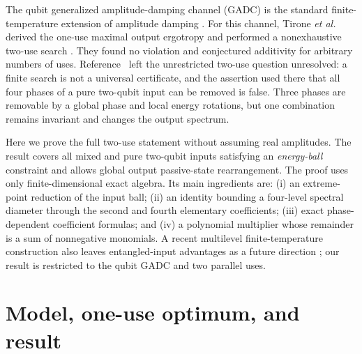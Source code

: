 \documentclass[pra,aps,twocolumn,nofootinbib,superscriptaddress]{revtex4-2}
\begin{document}
The qubit generalized amplitude-damping channel (GADC) is the standard
finite-temperature extension of amplitude damping \cite{khatri2020}.  For
this channel, Tirone \emph{et al.} derived the one-use maximal output
ergotropy and performed a nonexhaustive two-use search \cite{tirone2025}.
They found no violation and conjectured additivity for arbitrary numbers of
uses.  Reference~\cite{tirone2025} left the unrestricted two-use question
unresolved: a finite search is not a universal certificate, and the assertion
used there that all four phases of a pure two-qubit input can be removed is
false.  Three phases are removable by a global phase and local energy
rotations, but one combination remains invariant and changes the output
spectrum.

Here we prove the full two-use statement without assuming real amplitudes.
The result covers all mixed and pure two-qubit inputs satisfying an
\emph{energy-ball} constraint and allows global output passive-state
rearrangement.  The proof uses only finite-dimensional exact algebra.  Its
main ingredients are: (i) an extreme-point reduction of the input ball;
(ii) an identity bounding a four-level spectral diameter through the second
and fourth elementary coefficients; (iii) exact phase-dependent coefficient
formulas; and (iv) a polynomial multiplier whose remainder is a sum of
nonnegative monomials.  A recent multilevel finite-temperature construction
also leaves entangled-input advantages as a future direction
\cite{vetrano2026}; our result is restricted to the qubit GADC and two
parallel uses.

\section{Model, one-use optimum, and result}
\label{sec:model}
\end{document}
